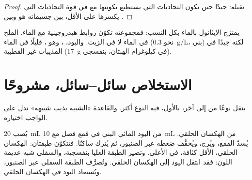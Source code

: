 \begin{proof}
نقبله:   جيدًا حين تكون التجاذبات التي يستطيع تكوينها مع  في قوة
التجاذبات التي يكسرها على الأقل، بين جسيماته هو وبين 
.
\end{proof}

\begin{example}\label{ex:g11:dissolution:cases}
يمتزج الإيثانول بالماء بكل النسب: فمجموعته  تكوّن روابط هيدروجينية مع
الماء.  الملح في الماء لا في الزيت. واليود، ، وهو ،
 قليلًا في الماء (نحو \qty{0.3}{g/L}،  بني) لكنه  جيدًا في
المذيبات غير القطبية (\qty{17}{g} في كيلوغرام الهبتان، 
بنفسجي).
\end{example}

\section{الاستخلاص سائل--سائل، مشروحًا}

ينقل  نوعًا من  إلى  آخر، 
بالأول،  فيه النوع أكثر. والقاعدة «الشبيه يذيب شبيهه» تدل على 
الواجب اختياره.

\begin{inthelab}
يُصب \qty{20}{mL} من  اليود المائي البني في قمع فصل مع
\qty{10}{mL} من الهكسان الحلقي. يُسدّ القمع، ويُرج، ويُخفَّف ضغطه عبر الصنبور،
ثم يُترك ساكنًا. فتتكوّن طبقتان: الهكسان الحلقي، الأقل كثافة، في الأعلى. وتصير
الطبقة العليا بنفسجية، والسفلى شبه عديمة اللون: فقد انتقل اليود إلى الهكسان
الحلقي. وتُصرَّف الطبقة السفلى عبر الصنبور، ويُستعاد اليود في الهكسان
الحلقي.
\end{inthelab}

